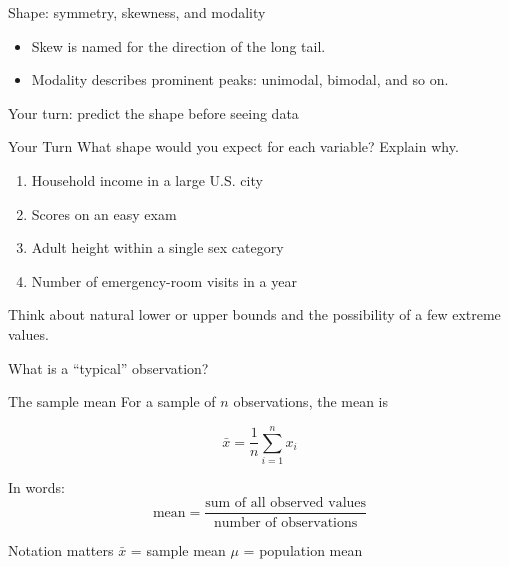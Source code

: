 \documentclass[11pt,aspectratio=169]{beamer}
\newcommand{\yourturn}[1]{%
\begin{center}
\begin{minipage}{0.90\textwidth}
\begin{alertblock}{Your Turn}
#1
\end{alertblock}
\end{minipage}
\end{center}}
\begin{document}
\begin{frame}{Shape: symmetry, skewness, and modality}
\centering
{}

\vspace{1.4em}
\begin{itemize}
  \item \alert{Skew} is named for the direction of the long tail.
  \item \alert{Modality} describes prominent peaks: unimodal, bimodal, and so on.
\end{itemize}
\end{frame}

\begin{frame}{Your turn: predict the shape before seeing data}
\yourturn{What shape would you expect for each variable? Explain why.
\begin{enumerate}
  \item Household income in a large U.S. city
  \item Scores on an easy exam
  \item Adult height within a single sex category
  \item Number of emergency-room visits in a year
\end{enumerate}}

\vfill
\small
Think about natural lower or upper bounds and the possibility of a few extreme values.
\end{frame}

\begin{frame}[standout]
\Large What is a ``typical'' observation?
\end{frame}

\begin{frame}{The sample mean}
For a sample of $n$ observations, the mean is

\[
\boxed{\bar{x}=\frac{1}{n}\sum_{i=1}^{n} x_i}
\]

\vspace{0.6em}
In words:
\[
\text{mean}=\frac{\text{sum of all observed values}}{\text{number of observations}}
\]

\vfill
\begin{block}{Notation matters}
$\bar{x}$ = sample mean \qquad $\mu$ = population mean
\end{block}
\end{frame}
\end{document}
